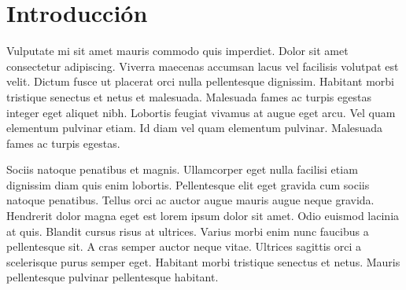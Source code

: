 
\newpage
\clearpage{\pagestyle{empty}\cleardoublepage}
\newpage

\chapter*{\centering \large Introducción} 

Vulputate mi sit amet mauris commodo quis imperdiet. Dolor sit amet consectetur adipiscing. Viverra maecenas accumsan lacus vel facilisis volutpat est velit. Dictum fusce ut placerat orci nulla pellentesque dignissim. Habitant morbi tristique senectus et netus et malesuada. Malesuada fames ac turpis egestas integer eget aliquet nibh. Lobortis feugiat vivamus at augue eget arcu. Vel quam elementum pulvinar etiam. Id diam vel quam elementum pulvinar. Malesuada fames ac turpis egestas.

Sociis natoque penatibus et magnis. Ullamcorper eget nulla facilisi etiam dignissim diam quis enim lobortis. Pellentesque elit eget gravida cum sociis natoque penatibus. Tellus orci ac auctor augue mauris augue neque gravida. Hendrerit dolor magna eget est lorem ipsum dolor sit amet. Odio euismod lacinia at quis. Blandit cursus risus at ultrices. Varius morbi enim nunc faucibus a pellentesque sit. A cras semper auctor neque vitae. Ultrices sagittis orci a scelerisque purus semper eget. Habitant morbi tristique senectus et netus. Mauris pellentesque pulvinar pellentesque habitant.